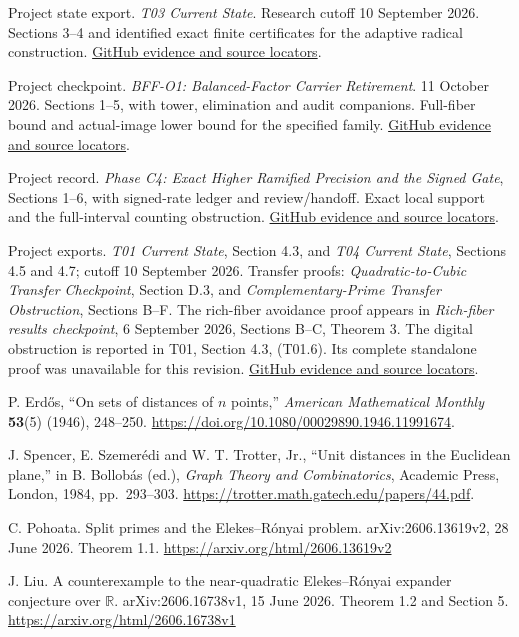 Project state export. \emph{T03 Current State}. Research cutoff 10 September 2026. Sections 3--4 and identified exact finite certificates for the adaptive radical construction. \href{https://github.com/hnt119/polynomial-image-compression/blob/bd1f2d663262821575eebdfa559b7c25f76b46ab/research/exports/2026-11-05-report-references/README.md#ref14}{GitHub evidence and source locators}.

Project checkpoint. \emph{BFF-O1: Balanced-Factor Carrier Retirement}. 11 October 2026. Sections 1--5, with tower, elimination and audit companions. Full-fiber bound and actual-image lower bound for the specified family. \href{https://github.com/hnt119/polynomial-image-compression/blob/bd1f2d663262821575eebdfa559b7c25f76b46ab/research/exports/2026-11-05-report-references/README.md#ref15}{GitHub evidence and source locators}.

Project record. \emph{Phase C4: Exact Higher Ramified Precision and the Signed Gate}, Sections 1--6, with signed-rate ledger and review/handoff. Exact local support and the full-interval counting obstruction. \href{https://github.com/hnt119/polynomial-image-compression/blob/bd1f2d663262821575eebdfa559b7c25f76b46ab/research/exports/2026-11-05-report-references/README.md#ref16}{GitHub evidence and source locators}.

Project exports. \emph{T01 Current State}, Section 4.3, and \emph{T04 Current State}, Sections 4.5 and 4.7; cutoff 10 September 2026. Transfer proofs: \emph{Quadratic-to-Cubic Transfer Checkpoint}, Section D.3, and \emph{Complementary-Prime Transfer Obstruction}, Sections B--F. The rich-fiber avoidance proof appears in \emph{Rich-fiber results checkpoint}, 6 September 2026, Sections B--C, Theorem 3. The digital obstruction is reported in T01, Section 4.3, (T01.6). Its complete standalone proof was unavailable for this revision. \href{https://github.com/hnt119/polynomial-image-compression/blob/bd1f2d663262821575eebdfa559b7c25f76b46ab/research/exports/2026-11-05-report-references/README.md#ref17}{GitHub evidence and source locators}.

P. Erd\H{o}s, ``On sets of distances of $n$ points,'' \emph{American Mathematical Monthly} \textbf{53}(5) (1946), 248--250.
\url{https://doi.org/10.1080/00029890.1946.11991674}.

J. Spencer, E. Szemer\'edi and W. T. Trotter, Jr., ``Unit distances in the Euclidean plane,'' in B. Bollob\'as (ed.), \emph{Graph Theory and Combinatorics}, Academic Press, London, 1984, pp.~293--303.
\url{https://trotter.math.gatech.edu/papers/44.pdf}.

C. Pohoata. Split primes and the Elekes--R\'onyai problem. arXiv:2606.13619v2, 28 June 2026. Theorem 1.1. \url{https://arxiv.org/html/2606.13619v2}

J. Liu. A counterexample to the near-quadratic Elekes--R\'onyai expander conjecture over $\mathbb R$. arXiv:2606.16738v1, 15 June 2026. Theorem 1.2 and Section 5. \url{https://arxiv.org/html/2606.16738v1}
